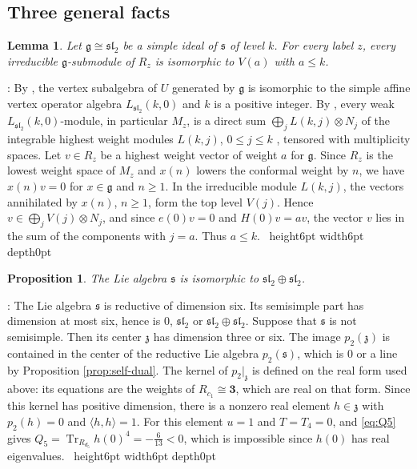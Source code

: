 \documentclass[leqno]{article}
\renewcommand{\leq}{\ensuremath{\leqslant}}
\renewcommand{\geq}{\ensuremath{\geqslant}}
\newcommand{\qed}{\hfill \vrule height6pt  width6pt depth0pt}
\newcommand{\ot}{\otimes}
\newtheorem{prop}[thm]{Proposition}
\newtheorem{lemma}[thm]{Lemma}
\newenvironment{proof}[1][]{\noindent {\it Proof #1} : }{\hbox{~}\qed
\smallskip
}
\numberwithin{equation}{section}
\begin{document}
\subsection{Three general facts}

\begin{lemma}
\label{lem:level-bound}
Let $\mathfrak g \cong \mathfrak{sl}_2$ be a simple ideal of $\mathfrak s$ of level $k$. For every label $z$, every irreducible $\mathfrak g$-submodule of $R_z$ is isomorphic to $V(a)$ with $a \leq k$.
\end{lemma}

\begin{proof}
By \cite[Theorem 3.1 p.~4]{DoM06}, the vertex subalgebra of $U$ generated by $\mathfrak g$ is isomorphic to the simple affine vertex operator algebra $L_{\mathfrak{sl}_2}(k,0)$ and $k$ is a positive integer. By \cite[Theorem 3.7 p.~7]{DLM97}, every weak $L_{\mathfrak{sl}_2}(k,0)$-module, in particular $M_z$, is a direct sum $\bigoplus_j L(k,j) \ot N_j$ of the integrable highest weight modules $L(k,j)$, $0 \leq j \leq k$ \cite{FrZ92}, tensored with multiplicity spaces. Let $v \in R_z$ be a highest weight vector of weight $a$ for $\mathfrak g$. Since $R_z$ is the lowest weight space of $M_z$ and $x(n)$ lowers the conformal weight by $n$, we have $x(n)v = 0$ for $x \in \mathfrak g$ and $n \geq 1$. In the irreducible module $L(k,j)$, the vectors annihilated by $x(n)$, $n \geq 1$, form the top level $V(j)$. Hence $v \in \bigoplus_j V(j) \ot N_j$, and since $e(0)v = 0$ and $H(0)v = av$, the vector $v$ lies in the sum of the components with $j = a$. Thus $a \leq k$.
\end{proof}

\begin{prop}
\label{prop:semisimple}
The Lie algebra $\mathfrak s$ is isomorphic to $\mathfrak{sl}_2 \oplus \mathfrak{sl}_2$.
\end{prop}

\begin{proof}
The Lie algebra $\mathfrak s$ is reductive of dimension six. Its semisimple part has dimension at most six, hence is $0$, $\mathfrak{sl}_2$ or $\mathfrak{sl}_2 \oplus \mathfrak{sl}_2$. Suppose that $\mathfrak s$ is not semisimple. Then its center $\mathfrak z$ has dimension three or six. The image $p_2(\mathfrak z)$ is contained in the center of the reductive Lie algebra $p_2(\mathfrak s)$, which is $0$ or a line by Proposition \ref{prop:self-dual}. The kernel of $p_2|_{\mathfrak z}$ is defined on the real form used above: its equations are the weights of $R_{c_1} \cong \mathbf3$, which are real on that form. Since this kernel has positive dimension, there is a nonzero real element $h \in \mathfrak z$ with $p_2(h) = 0$ and $\langle h,h\rangle = 1$. For this element $u = 1$ and $T = T_4 = 0$, and \eqref{eq:Q5} gives $Q_5 = \operatorname{Tr}_{R_{d_5}}h(0)^4 = -\frac{6}{13} < 0$, which is impossible since $h(0)$ has real eigenvalues.
\end{proof}
\end{document}
